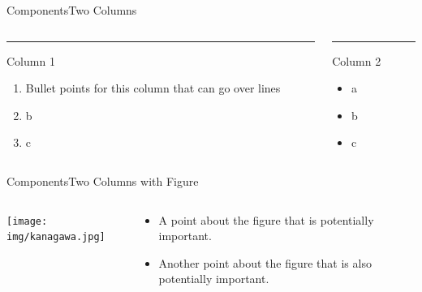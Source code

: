 \documentclass[aspectratio=169]{beamer}
\begin{document}
\begin{frame}{Components}{Two Columns}
    \begin{columns}[T]
    \vspace{0pt}
    \begin{column}{.50\textwidth}
        \vspace{0pt}
        {\color{accent}\rule{\linewidth}{2pt}}
        Column 1

        \begin{enumerate}
            \item Bullet points for this column that can go over lines
            \item b
            \item c
        \end{enumerate}

        \vspace*{50mm} %
    \end{column}
    
    \hfill
    
    \begin{column}{.50\textwidth}
        {\color{accent}\rule{\linewidth}{2pt}}
        Column 2

        \begin{itemize}
            \item a
            \item b
            \item c
        \end{itemize}
    \end{column}
    \end{columns}
\end{frame}

\begin{frame}{Components}{Two Columns with Figure}
    \begin{columns}[T]
    \vspace{0pt}
    \begin{column}{.6\textwidth}
        \texttt{[image: img/kanagawa.jpg]}

        \vspace*{50mm} %
    \end{column}
    \hfill
    \begin{column}{.4\textwidth}
        \begin{itemize}
            \item A point about the figure that is potentially important.
            \item Another point about the figure that is also potentially important.
        \end{itemize}
    \end{column}
    \end{columns}
\end{frame}
\end{document}

